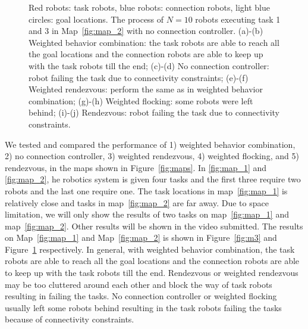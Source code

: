 \documentclass[../main.tex]{subfiles}
\begin{document}
\begin{figure}
\caption{Red robots: task robots, blue robots: connection robots, light blue circles: goal locations. The process of $N=10$ robots executing task 1 and 3 in Map~\ref{fig:map_2} with no connection controller. (a)-(b) Weighted behavior combination: the task robots are able to reach all the goal locations and the connection robots are able to keep up with the task robots till the end; (c)-(d) No connection controller: robot failing the task due to connectivity constraints; (e)-(f) Weighted rendezvous: perform the same as in weighted behavior combination; (g)-(h) Weighted flocking: some robots were left behind; (i)-(j) Rendezvous: robot failing the task due to connectivity constraints.}
\label{fig:m4}
\end{figure}

We tested and compared the performance of 1) weighted behavior combination, 2) no connection controller, 3) weighted rendezvous, 4) weighted flocking, and 5) rendezvous, in the maps shown in Figure~\ref{fig:maps}. In \ref{fig:map_1} and \ref{fig:map_2}, he robotics system is given four tasks and the first three require two robots and the last one require one. The task locations in map~\ref{fig:map_1} is relatively close and tasks in map~\ref{fig:map_2} are far away. Due to space limitation, we will only show the results of two tasks on map~\ref{fig:map_1} and map~\ref{fig:map_2}. Other results will be shown in the video submitted. The results on Map~\ref{fig:map_1} and Map~\ref{fig:map_2} is shown in Figure~\ref{fig:m3} and Figure~\ref{fig:m4} respectively. In general, with weighted behavior combination, the task robots are able to reach all the goal locations and the
connection robots are able to keep up with the task robots till the end. Rendezvous or weighted rendezvous may be too cluttered around each other and block the way of task robots resulting in failing the tasks. No connection controller or weighted flocking usually left some robots behind resulting in the task robots failing the tasks because of connectivity constraints.
\end{document}
